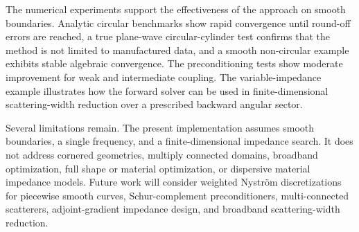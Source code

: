 \documentclass[11pt]{article}
\numberwithin{equation}{section}
\begin{document}
The numerical experiments support the effectiveness of the approach on smooth boundaries. Analytic circular benchmarks show rapid convergence until round-off errors are reached, a true plane-wave circular-cylinder test confirms that the method is not limited to manufactured data, and a smooth non-circular example exhibits stable algebraic convergence. The preconditioning tests show moderate improvement for weak and intermediate coupling. The variable-impedance example illustrates how the forward solver can be used in finite-dimensional scattering-width reduction over a prescribed backward angular sector.

Several limitations remain. The present implementation assumes smooth boundaries, a single frequency, and a finite-dimensional impedance search. It does not address cornered geometries, multiply connected domains, broadband optimization, full shape or material optimization, or dispersive material impedance models. Future work will consider weighted Nystr\"om discretizations for piecewise smooth curves, Schur-complement preconditioners, multi-connected scatterers, adjoint-gradient impedance design, and broadband scattering-width reduction.
\end{document}
